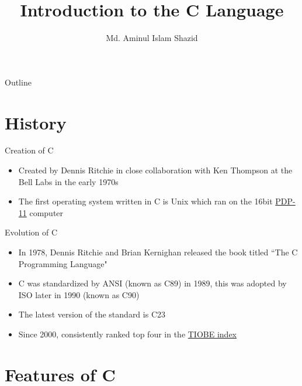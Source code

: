 \documentclass[12pt, aspectratio=169]{beamer}
\title{Introduction to the C Language}
\author{Md. Aminul Islam Shazid}
\date{}
\begin{document}
    {
		\addtocounter{framenumber}{-2}    %

		\begin{frame}
			\titlepage
		\end{frame}

		\begin{frame}{Outline}
			\tableofcontents[subsectionstyle=hide]
		\end{frame}
	}

    \section{History}

    \begin{frame}{Creation of C}
        \begin{itemize}
            \item Created by Dennis Ritchie in close collaboration with Ken Thompson at the Bell Labs in the early 1970s
            \item The first operating system written in C is Unix which ran on the 16bit \href{https://en.wikipedia.org/wiki/PDP-11}{PDP-11} computer
            
        \end{itemize}
    \end{frame}
    
    \begin{frame}{Evolution of C}
        \begin{itemize}
            \item In 1978, Dennis Ritchie and Brian Kernighan released the book titled ``The C Programming Language"
            \item C was standardized by ANSI (known as C89) in 1989, this was adopted by ISO later in 1990 (known as C90)
            \item The latest version of the standard is C23
            \item Since 2000, consistently ranked top four in the \href{https://en.wikipedia.org/wiki/TIOBE_index}{TIOBE index}
        \end{itemize}
    \end{frame}

	\section{Features of C}
	
\end{document}

